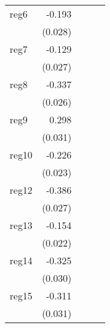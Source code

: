 {\begin{longtable}{l*{4}{D{.}{.}{-1}}}
\addlinespace
reg6        &      -0.193\sym{***}&                     &                     &                     \\
            &     (0.028)         &                     &                     &                     \\
\addlinespace
reg7        &      -0.129\sym{***}&                     &                     &                     \\
            &     (0.027)         &                     &                     &                     \\
\addlinespace
reg8        &      -0.337\sym{***}&                     &                     &                     \\
            &     (0.026)         &                     &                     &                     \\
\addlinespace
reg9        &       0.298\sym{***}&                     &                     &                     \\
            &     (0.031)         &                     &                     &                     \\
\addlinespace
reg10       &      -0.226\sym{***}&                     &                     &                     \\
            &     (0.023)         &                     &                     &                     \\
\addlinespace
reg12       &      -0.386\sym{***}&                     &                     &                     \\
            &     (0.027)         &                     &                     &                     \\
\addlinespace
reg13       &      -0.154\sym{***}&                     &                     &                     \\
            &     (0.022)         &                     &                     &                     \\
\addlinespace
reg14       &      -0.325\sym{***}&                     &                     &                     \\
            &     (0.030)         &                     &                     &                     \\
\addlinespace
reg15       &      -0.311\sym{***}&                     &                     &                     \\
            &     (0.031)         &                     &                     &                     \\

\end{longtable}}
